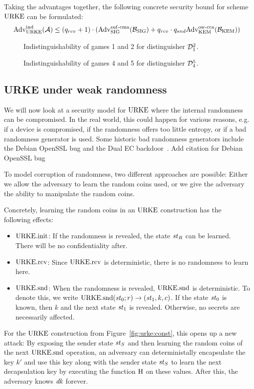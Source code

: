 Taking the advantages together, the following concrete security bound for scheme $\mathrm{URKE}$ can be formulated:
\[\mathrm{Adv}_{\mathrm{URKE}}^{\mathrm{ind}}(\mathcal{A}) \leq (q_{rcv}+1)\cdot(\mathrm{Adv}_{\mathrm{SIG}}^{\mathrm{suf}\text{-}\mathrm{cma}}(\mathcal{B}_{\mathrm{SIG}})+q_{rcv}\cdot q_{snd}\mathrm{Adv}_{\mathrm{KEM}}^{\mathrm{ow}\text{-}\mathrm{cca}}(\mathcal{B}_{\mathrm{KEM}}))\] 


\begin{figure}[!ht]
    \centering
    
    \caption{Indistinguishability of games 1 and 2 for distinguisher $\mathcal{D}_1^2$.}
    \label{fig:urke:ind:games1_2}
\end{figure}

\begin{figure}[!ht]
    \centering
    
    \caption{Indistinguishability of games 4 and 5 for distinguisher $\mathcal{D}_4^5$.}
    \label{fig:urke:ind:games4_5}
\end{figure}

\subsection{URKE under weak randomness}
We will now look at a security model for $\mathrm{URKE}$ where the internal randomness can be compromised.
In the real world, this could happen for various reasons, e.g. if a device is compromised, if the randomness offers too little entropy, or if a bad randomness generator is used.
Some historic bad randomness generators include the Debian OpenSSL bug and the Dual EC backdoor~\cite{EPRINT:BerLanNie15}. \alert{Add citation for Debian OpenSSL bug}

To model corruption of randomness, two different approaches are possible:
Either we allow the adversary to learn the random coins used, or we give the adversary the ability to manipulate the random coins.

Concretely, learning the random coins in an $\mathrm{URKE}$ construction has the following effects:
\begin{itemize}
    \item $\mathrm{URKE}.\mathrm{init}$: If the randomness is revealed, the state $\mathit{st}_R$ can be learned. 
    There will be no confidentiality after.
    \item $\mathrm{URKE}.\mathrm{rcv}$: Since $\mathrm{URKE}.\mathrm{rcv}$ is deterministic, there is no randomness to learn here.
    \item $\mathrm{URKE}.\mathrm{snd}$: When the randomness is revealed, $\mathrm{URKE}.\mathrm{snd}$ is deterministic. 
    To denote this, we write $\mathrm{URKE}.\mathrm{snd}(\mathit{st}_0;r)\to(\mathit{st}_1, k, c)$. 
    If the state $\mathit{st}_0$ is known, then $k$ and the next state $\mathit{st}_1$ is revealed.
    Otherwise, no secrets are necessarily affected.
\end{itemize}

For the $\mathrm{URKE}$ construction from Figure~\ref{fig:urke:const}, this opens up a new attack:
By exposing the sender state $\mathit{st}_S$ and then learning the random coins of the next $\mathrm{URKE}.\mathrm{snd}$ operation, an adversary can deterministally encapsulate the key $k'$ and use this key along with the sender state $\mathit{st}_S$ to learn the next decapsulation key by executing the function $\mathrm{H}$ on these values.
After this, the adversary knows $\mathit{dk}$ forever.
